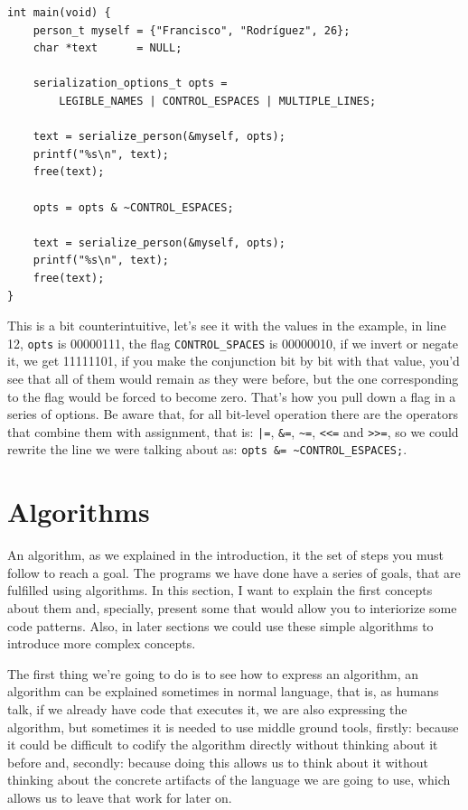 \documentclass[a4paper]{article}
\begin{document}
\noindent
\begin{minipage}[H]{\linewidth}
\mbox{}
\begin{lstlisting}[style=C, label={lst:setFlagOff},
caption={Example of pulling down a flag}]
int main(void) {
    person_t myself = {"Francisco", "Rodríguez", 26};
    char *text      = NULL;

    serialization_options_t opts =
        LEGIBLE_NAMES | CONTROL_ESPACES | MULTIPLE_LINES;

    text = serialize_person(&myself, opts);
    printf("%s\n", text);
    free(text);

    opts = opts & ~CONTROL_ESPACES;

    text = serialize_person(&myself, opts);
    printf("%s\n", text);
    free(text);
}
\end{lstlisting}
\end{minipage}

This is a bit counterintuitive, let's see it with the values in the example, in
line 12, \verb!opts! is 00000111, the flag \verb!CONTROL_SPACES! is 00000010, if
we invert or negate it, we get 11111101, if you make the conjunction bit by bit
with that value, you'd see that all of them would remain as they were before,
but the one corresponding to the flag would be forced to become zero.
That's how you pull down a flag in a series of options. Be aware that, for all
bit-level operation there are the operators that combine them with assignment,
that is: \verb!|=!, \verb!&=!, \verb!~=!, \verb!<<=! and \verb!>>=!, so we could
rewrite the line we were talking about as:
\lstinline[style=C]!opts &= ~CONTROL_ESPACES;!.

\section{Algorithms}
An algorithm, as we explained in the introduction, it the set of steps you must
follow to reach a goal. The programs we have done have a series of goals, that
are fulfilled using algorithms. In this section, I want to explain the first
concepts about them and, specially, present some that would allow you to
interiorize some code patterns. Also, in later sections we could use these
simple algorithms to introduce more complex concepts.

The first thing we're going to do is to see how to express an algorithm, an
algorithm can be explained sometimes in normal language, that is, as humans
talk, if we already have code that executes it, we are also expressing the
algorithm, but sometimes it is needed to use middle ground tools, firstly:
because it could be difficult to codify the algorithm directly without thinking
about it before and, secondly: because doing this allows us to think about it
without thinking about the concrete artifacts of the language we are going to
use, which allows us to leave that work for later on.
\end{document}
